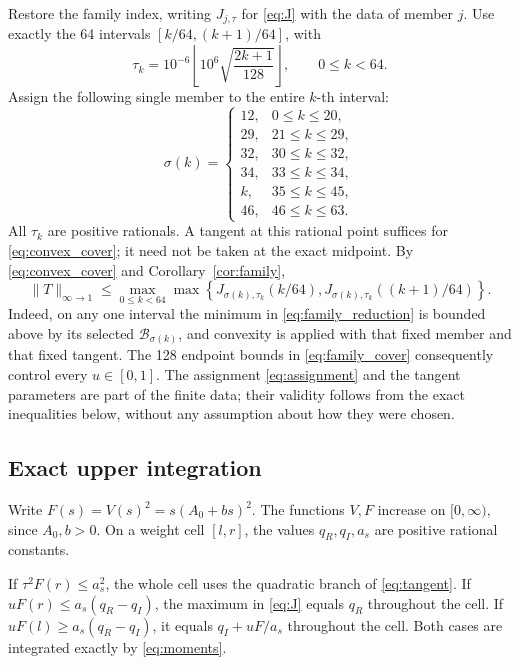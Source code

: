 \documentclass[11pt]{article}
\theoremstyle{remark}\newtheorem{remark}[theorem]{Remark}
\newcommand{\norm}[1]{\lVert #1\rVert}
\begin{document}
Restore the family index, writing \(J_{j,\tau}\) for
\eqref{eq:J} with the data of member \(j\). Use exactly the
64 intervals \([k/64,(k+1)/64]\), with
\begin{equation}\label{eq:tau}
\tau_k=10^{-6}\left\lfloor10^6\sqrt{\frac{2k+1}{128}}\right\rfloor,
\qquad0\le k<64.
\end{equation}
Assign the following single member to the entire \(k\)-th interval:
\begin{equation}\label{eq:assignment}
\sigma(k)=
\begin{cases}
12,&0\le k\le20,\\
29,&21\le k\le29,\\
32,&30\le k\le32,\\
34,&33\le k\le34,\\
k,&35\le k\le45,\\
46,&46\le k\le63.
\end{cases}
\end{equation}
All \(\tau_k\) are positive rationals. A tangent at this rational
point suffices for \eqref{eq:convex_cover}; it need not be taken
at the exact midpoint. By \eqref{eq:convex_cover} and
Corollary~\ref{cor:family},
\begin{equation}\label{eq:family_cover}
\norm T_{\infty\to1}\le
\max_{0\le k<64}\max\left\{
J_{\sigma(k),\tau_k}(k/64),
J_{\sigma(k),\tau_k}((k+1)/64)\right\}.
\end{equation}
Indeed, on any one interval the minimum in
\eqref{eq:family_reduction} is bounded above by its selected
\(\mathcal B_{\sigma(k)}\), and convexity is applied with that
fixed member and that fixed tangent. The 128 endpoint bounds in
\eqref{eq:family_cover} consequently control every \(u\in[0,1]\).
The assignment \eqref{eq:assignment} and the tangent parameters are
part of the finite data; their validity follows from the exact
inequalities below, without any assumption about how they were chosen.

\subsection{Exact upper integration}

Write \(F(s)=V(s)^2=s(A_0+bs)^2\). The functions \(V,F\) increase
on \([0,\infty)\), since \(A_0,b>0\). On a weight cell \([l,r]\),
the values \(q_R,q_I,a_s\) are positive rational constants.

If \(\tau^2F(r)\le a_s^2\), the whole cell uses the quadratic
branch of \eqref{eq:tangent}. If
\(uF(r)\le a_s(q_R-q_I)\), the maximum in \eqref{eq:J} equals
\(q_R\) throughout the cell. If
\(uF(l)\ge a_s(q_R-q_I)\), it equals \(q_I+uF/a_s\) throughout
the cell. Both cases are integrated exactly by \eqref{eq:moments}.
\end{document}
